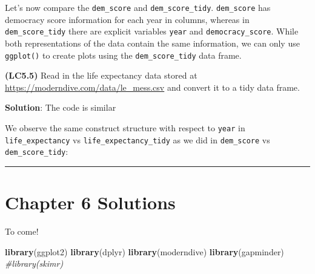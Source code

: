 \documentclass[12pt, krantz2,]{krantz}
\makeatletter
\newenvironment{Shaded}{\begin{snugshade}}{\end{snugshade}}
\newcommand{\CommentTok}[1]{\textcolor[rgb]{0.37,0.37,0.37}{\textit{#1}}}
\newcommand{\KeywordTok}[1]{\textcolor[rgb]{0.27,0.27,0.27}{\textbf{#1}}}
\newcommand{\NormalTok}[1]{#1}
\newenvironment{kframe}{%
\medskip{}
\setlength{\fboxsep}{.8em}
 \def\at@end@of@kframe{}%
 \ifinner\ifhmode%
  \def\at@end@of@kframe{\end{minipage}}%
  \begin{minipage}{\columnwidth}%
 \fi\fi%
 \def\FrameCommand##1{\hskip\@totalleftmargin \hskip-\fboxsep
 \colorbox{shadecolor}{##1}\hskip-\fboxsep
     \hskip-\linewidth \hskip-\@totalleftmargin \hskip\columnwidth}%
 \MakeFramed {\advance\hsize-\width
   \@totalleftmargin\z@ \linewidth\hsize
   \@setminipage}}%
 {\par\unskip\endMakeFramed%
 \at@end@of@kframe}
\renewenvironment{Shaded}{\begin{kframe}}{\end{kframe}}
\makeatother
\begin{document}
Let's now compare the \texttt{dem\_score} and \texttt{dem\_score\_tidy}. \texttt{dem\_score} has democracy score information for each year in columns, whereas in \texttt{dem\_score\_tidy} there are explicit variables \texttt{year} and \texttt{democracy\_score}. While both representations of the data contain the same information, we can only use \texttt{ggplot()} to create plots using the \texttt{dem\_score\_tidy} data frame.

\textbf{(LC5.5)} Read in the life expectancy data stored at \url{https://moderndive.com/data/le_mess.csv} and convert it to a tidy data frame.

\textbf{Solution}: The code is similar

We observe the same construct structure with respect to \texttt{year} in \texttt{life\_expectancy} vs \texttt{life\_expectancy\_tidy} as we did in \texttt{dem\_score} vs \texttt{dem\_score\_tidy}:

\begin{center}\rule{0.5\linewidth}{\linethickness}\end{center}

\hypertarget{chapter-6-solutions}{%
\section{Chapter 6 Solutions}\label{chapter-6-solutions}}

To come!

\begin{Shaded}
\begin{Highlighting}[]
\KeywordTok{library}\NormalTok{(ggplot2)}
\KeywordTok{library}\NormalTok{(dplyr)}
\KeywordTok{library}\NormalTok{(moderndive)}
\KeywordTok{library}\NormalTok{(gapminder)}
\CommentTok{#library(skimr)}
\end{Highlighting}
\end{Shaded}



\backmatter
\printindex
\end{document}
